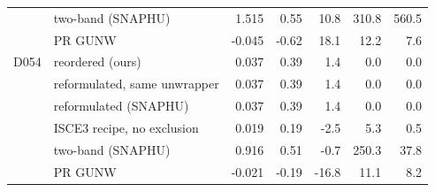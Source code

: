 \begin{tabular}{llrrrrr}
 & two-band (SNAPHU) & 1.515 & 0.55 & 10.8 & 310.8 & 560.5 \\
 & PR GUNW & -0.045 & -0.62 & 18.1 & 12.2 & 7.6 \\
\midrule
D054 & reordered (ours) & 0.037 & 0.39 & 1.4 & 0.0 & 0.0 \\
 & reformulated, same unwrapper & 0.037 & 0.39 & 1.4 & 0.0 & 0.0 \\
 & reformulated (SNAPHU) & 0.037 & 0.39 & 1.4 & 0.0 & 0.0 \\
 & ISCE3 recipe, no exclusion & 0.019 & 0.19 & -2.5 & 5.3 & 0.5 \\
 & two-band (SNAPHU) & 0.916 & 0.51 & -0.7 & 250.3 & 37.8 \\
 & PR GUNW & -0.021 & -0.19 & -16.8 & 11.1 & 8.2 \\
\bottomrule
\end{tabular}
